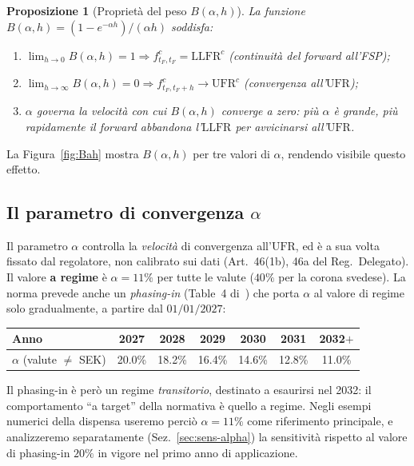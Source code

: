 \documentclass[11pt,a4paper]{article}
\theoremstyle{plain}
\newtheorem{proposizione}[teorema]{Proposizione}
\theoremstyle{definition}
\theoremstyle{remark}
\newcommand{\UFR}{\mathrm{UFR}}
\newcommand{\LLFR}{\mathrm{LLFR}}
\begin{document}
\begin{proposizione}[Propriet\`a del peso $B(\alpha,h)$]
\label{prop:Bah}
La funzione $B(\alpha,h)=(1-e^{-\alpha h})/(\alpha h)$ soddisfa:
\begin{enumerate}
  \item $\lim_{h\to 0} B(\alpha,h)=1 \Rightarrow f^c_{t_F,t_F}=\LLFR^c$ (continuit\`a del
        forward all'FSP);
  \item $\lim_{h\to\infty} B(\alpha,h)=0 \Rightarrow f^c_{t_F,t_F+h}\to\UFR^c$ (convergenza
        all'$\UFR$);
  \item $\alpha$ governa la velocit\`a con cui $B(\alpha,h)$ converge a zero: pi\`u $\alpha$ \`e
        grande, pi\`u rapidamente il forward abbandona l'$\LLFR$ per avvicinarsi all'$\UFR$.
\end{enumerate}
\end{proposizione}

La Figura~\ref{fig:Bah} mostra $B(\alpha,h)$ per tre valori di $\alpha$, rendendo visibile
questo effetto.

\subsection{Il parametro di convergenza \texorpdfstring{$\alpha$}{alpha}}
\label{sec:alpha}

Il parametro $\alpha$ controlla la \emph{velocit\`a} di convergenza all'$\UFR$, ed \`e a sua
volta fissato dal regolatore, non calibrato sui dati (Art.~46(1b), 46a del Reg.~Delegato). Il valore \textbf{a
regime} \`e $\alpha=11\%$ per tutte le valute ($40\%$ per la corona svedese). La norma prevede anche un
\emph{phasing-in} (Table~4 di~\cite{eiopa2026}) che porta $\alpha$ al valore di regime solo
gradualmente, a partire dal $01/01/2027$:
\begin{center}\small
\renewcommand{\arraystretch}{1.15}
\begin{tabular}{lcccccc}
\toprule
Anno & 2027 & 2028 & 2029 & 2030 & 2031 & 2032$+$\\
\midrule
$\alpha$ (valute $\neq$ SEK) & 20.0\% & 18.2\% & 16.4\% & 14.6\% & 12.8\% & 11.0\%\\
\bottomrule
\end{tabular}
\end{center}
Il phasing-in \`e per\`o un regime \emph{transitorio}, destinato a esaurirsi nel 2032: il
comportamento ``a target'' della normativa \`e quello a regime. Negli esempi numerici della
dispensa useremo perci\`o $\alpha=11\%$ come riferimento principale, e analizzeremo
separatamente (Sez.~\ref{sec:sens-alpha}) la sensitivit\`a rispetto al valore di phasing-in
$20\%$ in vigore nel primo anno di applicazione.
\end{document}
